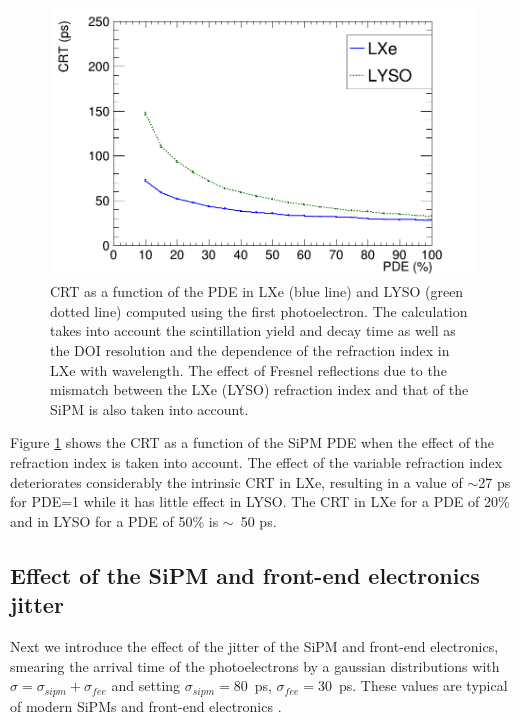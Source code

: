 \documentclass[review]{elsarticle}
\begin{document}
\begin{figure}[!bhtp]
	\centering
	\includegraphics[scale=0.30]{../img/PetaloTOF/CRTvsPDE_phys_LXeLYSONoJitterFstPE.png}
	\caption{\label{fig.crt2} CRT as a function of the PDE in LXe (blue line) and LYSO (green dotted line) computed using the first photoelectron. The calculation takes into account the scintillation yield and decay time as well as the DOI resolution and the dependence of the refraction index in LXe with wavelength. The effect of Fresnel reflections
	due to the mismatch between the LXe (LYSO) refraction index and that of the SiPM is also taken into
	account.  }
\end{figure}

Figure \ref{fig.crt2} shows the CRT as a function of the
 SiPM PDE when the effect of the refraction index is taken into account. 
 The effect of the variable refraction index deteriorates considerably the intrinsic CRT in LXe, resulting in a value of $\sim$27 ps for PDE=1 while it has little effect in LYSO. The CRT in LXe for a PDE of 20\% and in LYSO for a PDE of
 50\% is $\sim$~50 ps.
  
\subsection*{Effect of the SiPM  and front-end electronics jitter}
  Next we introduce the effect of the jitter of the SiPM and front-end electronics, smearing the arrival time of the photoelectrons by a gaussian distributions with $\sigma = \sigma_{sipm} +  \sigma_{fee}$ and setting 
 $\sigma_{sipm} = 80$~ps, $\sigma_{fee} = 30$~ps. These values are typical of modern SiPMs and front-end electronics \cite{FundamentalLimits}. 
 
\end{document}
